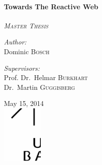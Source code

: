 \begin{titlepage}
\begin{center}


\vspace*{4cm}
\HRule \\[0.4cm]
{ \huge \bfseries Towards The Reactive Web \\[0.4cm] }
\HRule \\[1.5cm]


\vspace*{.5cm}
\textit{\textsc{\LARGE Master Thesis}}\\
\vspace*{2.5cm}

\begin{minipage}{0.4\textwidth}
\begin{flushleft} \large
\emph{Author:}\\
Dominic \textsc{Bosch}
\end{flushleft}
\end{minipage}
\begin{minipage}{0.4\textwidth}
\begin{flushright} \large
\emph{Supervisors:} \\
Prof. Dr.~Helmar \textsc{Burkhart}\\
Dr.~Martin \textsc{Guggisberg}
\end{flushright}
\end{minipage}

\vfill

{\large May 15, 2014} \\[1.5cm]



\includegraphics[width=0.15\textwidth]{figures/unilogoschwarz}~\\[1cm]
\end{center}
\end{titlepage}
